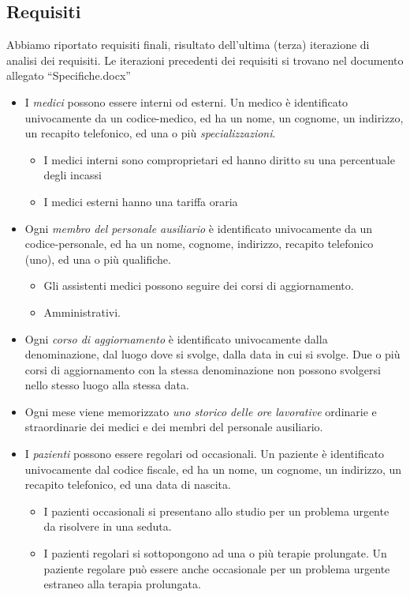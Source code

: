 \documentclass[11pt]{article}
\begin{document}
\subsection{Requisiti}
Abbiamo riportato requisiti finali, risultato dell'ultima (terza) iterazione di analisi dei requisiti.
Le iterazioni precedenti dei requisiti si trovano nel documento allegato ``Specifiche.docx''
\begin{itemize}
    \item I \emph{medici} possono essere interni od esterni. Un medico è identificato univocamente da un codice-medico, ed ha un nome, un cognome, un indirizzo, un recapito telefonico, ed una o più \emph{specializzazioni}.
    \begin{itemize}
        \item I medici interni sono comproprietari ed hanno diritto su una percentuale degli incassi
        \item I medici esterni hanno una tariffa oraria
    \end{itemize}
    \item Ogni \emph{membro del personale ausiliario} è identificato univocamente da un codice-personale, ed ha un nome, cognome, indirizzo, recapito telefonico (uno), ed una o più qualifiche.
    \begin{itemize}
        \item Gli assistenti medici possono seguire dei corsi di aggiornamento.
        \item Amministrativi.
    \end{itemize}
    \item Ogni \emph{corso di aggiornamento} è identificato univocamente dalla denominazione, dal luogo dove si svolge, dalla data in cui si svolge. Due o più corsi di aggiornamento con la stessa denominazione non possono svolgersi nello stesso luogo alla stessa data.
    \item Ogni mese viene memorizzato \emph{uno storico delle ore lavorative} ordinarie e straordinarie dei medici e dei membri del personale ausiliario.
    \item I \emph{pazienti} possono essere regolari od occasionali. Un paziente è identificato univocamente dal codice fiscale, ed ha un nome, un cognome, un indirizzo, un recapito telefonico, ed una data di nascita.
    \begin{itemize}
        \item I pazienti occasionali si presentano allo studio per un problema urgente da risolvere in una seduta.
        \item I pazienti regolari si sottopongono ad una o più terapie prolungate. Un paziente regolare può essere anche occasionale per un problema urgente estraneo alla terapia prolungata.

\end{itemize}
\end{itemize}
\end{document}
